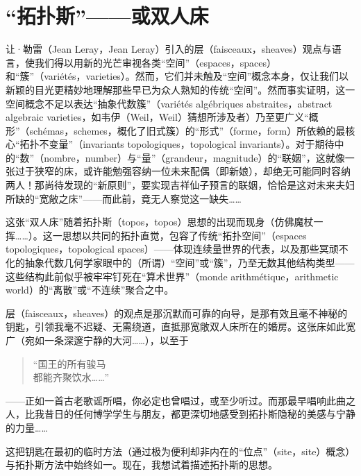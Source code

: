 \section{“拓扑斯”——或双人床}

让·勒雷（Jean Leray，Jean Leray）引入的层（faisceaux，sheaves）观点与语言，使我们得以用新的光芒审视各类“空间”（espaces，spaces）和“簇”（variétés，varieties）。然而，它们并未触及“空间”概念本身，仅让我们以新颖的目光更精妙地理解那些早已为众人熟知的传统“空间”。然而事实证明，这一空间概念不足以表达“抽象代数簇”（variétés algébriques abstraites，abstract algebraic varieties，如韦伊（Weil，Weil）猜想所涉及者）乃至更广义“概形”（schémas，schemes，概化了旧式簇）的“形式”（forme，form）所依赖的最核心“拓扑不变量”（invariants topologiques，topological invariants）。对于期待中的“数”（nombre，number）与“量”（grandeur，magnitude）的“联姻”，这就像一张过于狭窄的床，或许能勉强容纳一位未来配偶（即新娘），却绝无可能同时容纳两人！那尚待发现的“新原则”，要实现吉祥仙子预言的联姻，恰恰是这对未来夫妇所缺的“宽敞之床”——而此前，竟无人察觉这一缺失……

这张“双人床”随着拓扑斯（topos，topos）思想的出现而现身（仿佛魔杖一挥……）。这一思想以共同的拓扑直觉，包容了传统“拓扑空间”（espaces topologiques，topological spaces）——体现连续量世界的代表，以及那些冥顽不化的抽象代数几何学家眼中的（所谓）“空间”或“簇”，乃至无数其他结构类型——这些结构此前似乎被牢牢钉死在“算术世界”（monde arithmétique，arithmetic world）的“离散”或“不连续”聚合之中。

层（faisceaux，sheaves）的观点是那沉默而可靠的向导，是那有效且毫不神秘的钥匙，引领我毫不迟疑、无需绕道，直抵那宽敞双人床所在的婚房。这张床如此宽广（宛如一条深邃宁静的大河……），以至于
\begin{quote}
    “国王的所有骏马\\
    都能齐聚饮水……”
\end{quote}
——正如一首古老歌谣所唱，你必定也曾唱过，或至少听过。而那最早唱响此曲之人，比我昔日的任何博学学生与朋友，都更深切地感受到拓扑斯隐秘的美感与宁静的力量……

这把钥匙在最初的临时方法（通过极为便利却非内在的“位点”（site，site）概念）与拓扑斯方法中始终如一。现在，我想试着描述拓扑斯的思想。

